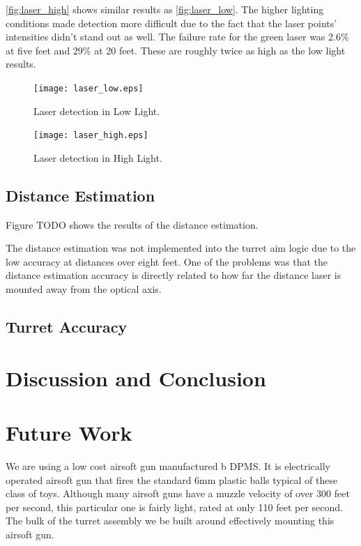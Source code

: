 \documentclass[10pt,twocolumn,letterpaper]{article}
\begin{document}
\ref{fig:laser_high} shows similar results as \ref{fig:laser_low}. The higher lighting conditions made detection more difficult due to the fact that the laser points' intensities didn't stand out as well. The failure rate for the green laser was 2.6\% at five feet and 29\% at 20 feet. These are roughly twice as high as the low light results. 

\begin{figure}[t]
\begin{center}
  \texttt{[image: laser\_low.eps]}
\end{center}
   \caption{Laser detection in Low Light.}
\label{fig:laser_low}
\label{fig:long}
\label{fig:onecol}
\end{figure}

\begin{figure}[t]
\begin{center}
  \texttt{[image: laser\_high.eps]}
\end{center}
   \caption{Laser detection in High Light.}
\label{fig:laser_high}
\label{fig:long}
\label{fig:onecol}
\end{figure}

\subsection{Distance Estimation}

Figure TODO shows the results of the distance estimation.

The distance estimation was not implemented into the turret aim logic due to the low accuracy at distances over eight feet. One of the problems was that the distance estimation accuracy is directly related to how far the distance laser is mounted away from the optical axis.  

\subsection{Turret Accuracy}


\section{Discussion and Conclusion}


\section{Future Work}
We are using a low cost airsoft gun manufactured b DPMS. It is electrically operated airsoft gun that fires the standard 6mm plastic balls typical of these class of toys. Although many airsoft guns have a muzzle velocity of over 300 feet per second, this particular one is fairly light, rated at only 110 feet per second. The bulk of the turret assembly we be built around effectively mounting this airsoft gun.
\end{document}
